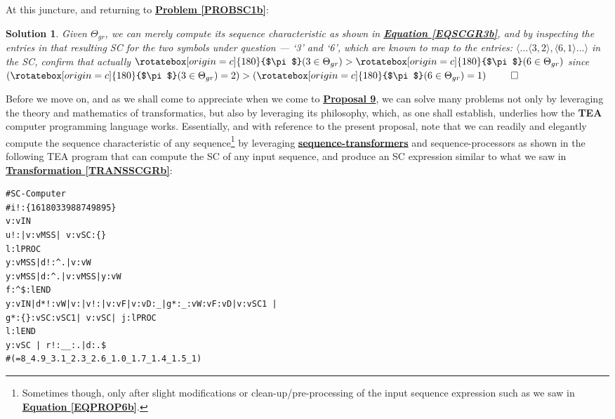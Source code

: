 \documentclass[a4paper, 18pt]{book} %
\newtheorem{soln}{Solution}
\newcommand{\invpi}{\rotatebox[origin=c]{180}{$\pi$}}
\begin{document}
\begin{appendices}
At this juncture, and returning to \textbf{\hyperref[PROBSC1b]{Problem \ref{PROBSC1b}}}:

\vspace{1em}
\begin{soln}
Given $\Theta_{gr}$, we can merely compute its sequence characteristic as shown in \textbf{\hyperref[EQSCGR3b]{Equation \ref{EQSCGR3b}}}, and by inspecting the entries in that resulting SC for the two symbols under question --- `3' and `6', which are known to map to the entries: $\langle ... \langle 3, 2 \rangle, \langle 6, 1 \rangle ... \rangle$ in the SC, confirm that actually $\invpi(3 \in \Theta_{gr}) > \invpi(6 \in \Theta_{gr})$ since $(\invpi(3 \in \Theta_{gr})=2) > (\invpi(6 \in \Theta_{gr})=1)$
$\qed$
\end{soln}
\vspace{1em}

Before we move on, and as we shall come to appreciate when we come to \textbf{\hyperref[PROP9]{Proposal 9}}, we can solve many problems not only by leveraging the theory and mathematics of transformatics, but also by leveraging its philosophy, which, as one shall establish, underlies how the \textbf{TEA} computer programming language\cite{cli_tttt} works. Essentially, and with reference to the present proposal, note that we can readily and elegantly compute the sequence characteristic of any sequence\footnote{Sometimes though, only after slight modifications or clean-up/pre-processing of the input sequence expression such as we saw in \textbf{\hyperref[EQPROP6b]{Equation \ref{EQPROP6b}}}.} by leveraging \textbf{\hyperref[RES7]{sequence-transformers}} and sequence-processors as shown in the following TEA program that can compute the SC of any input sequence, and produce an SC expression similar to what we saw in \textbf{\hyperref[TRANSSCGRb]{Transformation \ref{TRANSSCGRb}}}:


  \begin{tcolorbox}[teaterminalstyle, title=TEA Program: SC-Transformer, breakable]
  \begin{lstlisting}[language=TEA,breaklines=true]
#SC-Computer
#i!:{1618033988749895} 
v:vIN
u!:|v:vMSS| v:vSC:{}
l:lPROC
y:vMSS|d!:^.|v:vW
y:vMSS|d:^.|v:vMSS|y:vW
f:^$:lEND
y:vIN|d*!:vW|v:|v!:|v:vF|v:vD:_|g*:_:vW:vF:vD|v:vSC1 |
g*:{}:vSC:vSC1| v:vSC| j:lPROC
l:lEND
y:vSC | r!:__:.|d:.$
#(=8_4.9_3.1_2.3_2.6_1.0_1.7_1.4_1.5_1)
   \end{lstlisting}
  \end{tcolorbox}
  \label{LISTSC}
  

\end{appendices}
\end{document}
